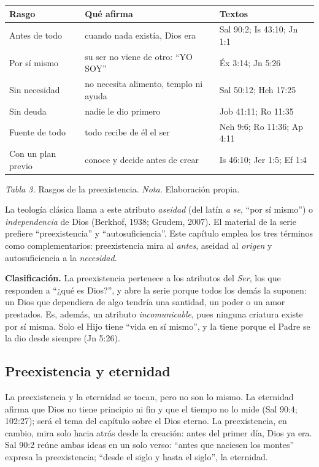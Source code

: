\documentclass[11pt,letterpaper]{article}
\begin{document}
\begin{center}\small\renewcommand{\arraystretch}{1.2}
\begin{tabular}{@{}L{3.4cm}L{6.6cm}L{4.4cm}@{}}
\toprule
\textbf{Rasgo} & \textbf{Qué afirma} & \textbf{Textos} \\ \midrule
Antes de todo & cuando nada existía, Dios era & Sal 90:2; Is 43:10; Jn 1:1 \\
Por sí mismo & su ser no viene de otro: ``YO SOY'' & Éx 3:14; Jn 5:26 \\
Sin necesidad & no necesita alimento, templo ni ayuda & Sal 50:12; Hch 17:25 \\
Sin deuda & nadie le dio primero & Job 41:11; Ro 11:35 \\
Fuente de todo & todo recibe de él el ser & Neh 9:6; Ro 11:36; Ap 4:11 \\
Con un plan previo & conoce y decide antes de crear & Is 46:10; Jer 1:5; Ef 1:4 \\
\bottomrule
\end{tabular}\par
{\footnotesize\color{gris}\textit{Tabla 3.} Rasgos de la preexistencia. \textit{Nota.} Elaboración propia.}
\end{center}

\begin{nota}[Precisión]
La teología clásica llama a este atributo \emph{aseidad} (del latín \emph{a se}, ``por sí mismo'') o \emph{independencia} de Dios (Berkhof, 1938; Grudem, 2007). El material de la serie prefiere ``preexistencia'' y ``autosuficiencia''. Este capítulo emplea los tres términos como complementarios: preexistencia mira al \emph{antes}, aseidad al \emph{origen} y autosuficiencia a la \emph{necesidad}.
\end{nota}

\textbf{Clasificación.} La preexistencia pertenece a los atributos del \emph{Ser}, los que responden a ``¿qué es Dios?'', y abre la serie porque todos los demás la suponen: un Dios que dependiera de algo tendría una santidad, un poder o un amor prestados. Es, además, un atributo \emph{incomunicable}, pues ninguna criatura existe por sí misma. Solo el Hijo tiene ``vida en sí mismo'', y la tiene porque el Padre se la dio desde siempre (Jn 5:26).

\subsection{Preexistencia y eternidad}
La preexistencia y la eternidad se tocan, pero no son lo mismo. La eternidad afirma que Dios no tiene principio ni fin y que el tiempo no lo mide (Sal 90:4; 102:27); será el tema del capítulo sobre el Dios eterno. La preexistencia, en cambio, mira solo hacia atrás desde la creación: antes del primer día, Dios ya era. Sal 90:2 reúne ambas ideas en un solo verso: ``antes que naciesen los montes'' expresa la preexistencia; ``desde el siglo y hasta el siglo'', la eternidad.
\end{document}
